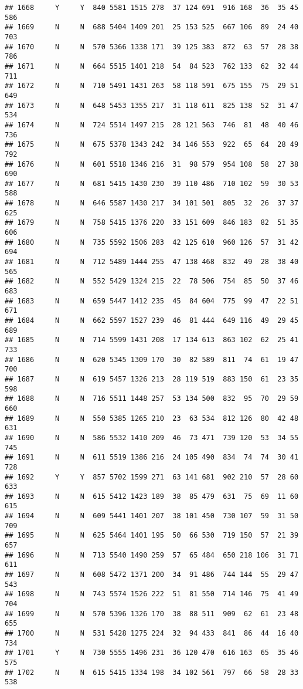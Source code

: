 \documentclass[]{article}
\begin{document}
\begin{verbatim}
## 1668     Y     Y  840 5581 1515 278  37 124 691  916 168  36  35 45  586
## 1669     N     N  688 5404 1409 201  25 153 525  667 106  89  24 40  703
## 1670     N     N  570 5366 1338 171  39 125 383  872  63  57  28 38  786
## 1671     N     N  664 5515 1401 218  54  84 523  762 133  62  32 44  711
## 1672     N     N  710 5491 1431 263  58 118 591  675 155  75  29 51  649
## 1673     N     N  648 5453 1355 217  31 118 611  825 138  52  31 47  534
## 1674     N     N  724 5514 1497 215  28 121 563  746  81  48  40 46  736
## 1675     N     N  675 5378 1343 242  34 146 553  922  65  64  28 49  792
## 1676     N     N  601 5518 1346 216  31  98 579  954 108  58  27 38  690
## 1677     N     N  681 5415 1430 230  39 110 486  710 102  59  30 53  588
## 1678     N     N  646 5587 1430 217  34 101 501  805  32  26  37 37  625
## 1679     N     N  758 5415 1376 220  33 151 609  846 183  82  51 35  606
## 1680     N     N  735 5592 1506 283  42 125 610  960 126  57  31 42  694
## 1681     N     N  712 5489 1444 255  47 138 468  832  49  28  38 40  565
## 1682     N     N  552 5429 1324 215  22  78 506  754  85  50  37 46  683
## 1683     N     N  659 5447 1412 235  45  84 604  775  99  47  22 51  671
## 1684     N     N  662 5597 1527 239  46  81 444  649 116  49  29 45  689
## 1685     N     N  714 5599 1431 208  17 134 613  863 102  62  25 41  733
## 1686     N     N  620 5345 1309 170  30  82 589  811  74  61  19 47  700
## 1687     N     N  619 5457 1326 213  28 119 519  883 150  61  23 35  598
## 1688     N     N  716 5511 1448 257  53 134 500  832  95  70  29 59  660
## 1689     N     N  550 5385 1265 210  23  63 534  812 126  80  42 48  631
## 1690     N     N  586 5532 1410 209  46  73 471  739 120  53  34 55  745
## 1691     N     N  611 5519 1386 216  24 105 490  834  74  74  30 41  728
## 1692     Y     Y  857 5702 1599 271  63 141 681  902 210  57  28 60  633
## 1693     N     N  615 5412 1423 189  38  85 479  631  75  69  11 60  615
## 1694     N     N  609 5441 1401 207  38 101 450  730 107  59  31 50  709
## 1695     N     N  625 5464 1401 195  50  66 530  719 150  57  21 39  657
## 1696     N     N  713 5540 1490 259  57  65 484  650 218 106  31 71  611
## 1697     N     N  608 5472 1371 200  34  91 486  744 144  55  29 47  543
## 1698     N     N  743 5574 1526 222  51  81 550  714 146  75  41 49  704
## 1699     N     N  570 5396 1326 170  38  88 511  909  62  61  23 48  655
## 1700     N     N  531 5428 1275 224  32  94 433  841  86  44  16 40  734
## 1701     Y     N  730 5555 1496 231  36 120 470  616 163  65  35 46  575
## 1702     N     N  615 5415 1334 198  34 102 561  797  66  58  28 33  538

\end{verbatim}
\end{document}
